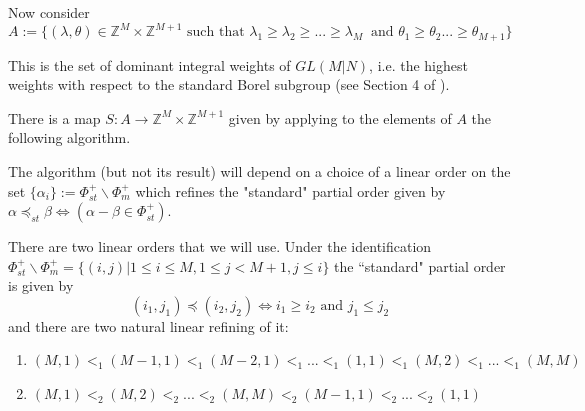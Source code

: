 \documentclass[12pt]{amsart}
\numberwithin{equation}{section}
\numberwithin{equation}{section}
\theoremstyle{definition}
\begin{document}
Now consider 
\begin{equation}
    A := \{(\lambda,\theta)\in\mathbb{Z}^M\times\mathbb{Z}^{M+1} \text{ such that } \lambda_1 \ge \lambda_2 \ge ... \ge \lambda_M\ \text{ and }\theta_1\ge \theta_2 ... \ge \theta_{M+1}\}
\end{equation} 

This is the set of dominant integral weights of $GL(M|N)$, i.e. the highest weights with respect to the standard Borel subgroup (see Section 4 of \cite{bk}).

There is a map $S:A \to \mathbb{Z}^M\times\mathbb{Z}^{M+1}$ given by applying to the elements of $A$ the following algorithm.

The algorithm (but not its result) will depend on a choice of a linear order on the set $\{\alpha_i\} := \Phi^+_{st}\backslash \Phi^+_m$ which refines the "standard" partial order given by $\alpha \preccurlyeq_{st} \beta \iff (\alpha-\beta \in \Phi_{st}^+)$.
    
There are two linear orders that we will use. Under the identification $\Phi^+_{st}\backslash \Phi^+_m =\{(i,j)|1 \le i \le M,1\le j< M+1, j \le i\}$ the ``standard"  partial order is given by
\begin{equation}
    (i_1,j_1) \preccurlyeq (i_2,j_2) \iff i_1\ge i_2 \text{ and } j_1 \le j_2
\end{equation}
and there are two natural linear refining of it:
\begin{enumerate}
    \item $(M,1)<_1(M-1,1)<_1(M-2,1)<_1...<_1(1,1)<_1(M,2)<_1...<_1(M,M)$
    \item $(M,1)<_2(M,2)<_2...<_2(M,M)<_2(M-1,1)<_2...<_2(1,1)$
\end{enumerate}
    
\end{document}
